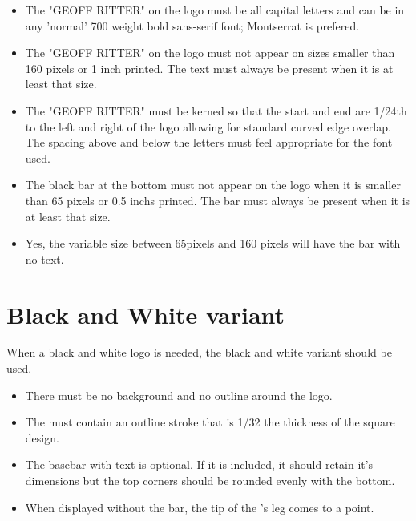 \documentclass{logo_styleguide}
\begin{document}
\begin{itemize}
    \item The "\headingfont GEOFF RITTER\normalfont" on the logo must be all capital letters and can be in any 'normal' 700 weight bold sans-serif font; Montserrat is prefered.
    \item The "\headingfont GEOFF RITTER\normalfont" on the logo must not appear on sizes smaller than 160 pixels or 1 inch printed. The text
    must always be present when it is at least that size.
    \item The "\headingfont GEOFF RITTER\normalfont" must be kerned so that the start and end are 1/24th to the left and right of the logo
    allowing for standard curved edge overlap. The spacing above and below the letters must feel appropriate for the
    font used.
    \item The black bar at the bottom must not appear on the logo when it is smaller than 65 pixels or 0.5 inchs
    printed. The bar must always be present when it is at least that size.
    \item Yes, the variable size between 65pixels and 160 pixels will have the bar with no text.
\end{itemize}



\section{Black and White variant}
When a black and white logo is needed, the black and white variant should be used.
\begin{itemize}
    \item There must be no background and no outline around the logo.
    \item The \rchar\hspace{0.125em} must contain an outline stroke that is 1/32 the thickness of the square design.
    \item The basebar with text is optional. If it is included, it should retain it's dimensions but the top corners should be rounded evenly with the bottom.
    \item When displayed without the bar, the tip of the \rchar's leg comes to a point.
\end{itemize}

\logoblackwhite
\end{document}
